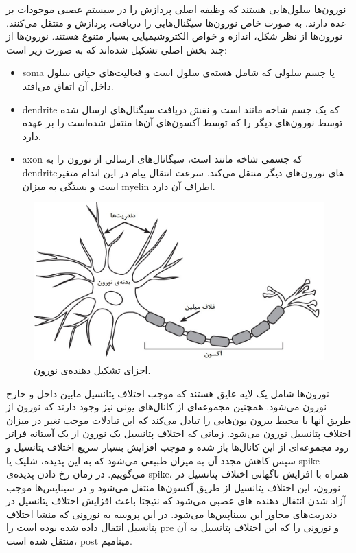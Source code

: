 \documentclass[12pt]{report}
\begin{document}
	نورون‌ها سلول‌هایی هستند که وظیفه اصلی پردازش را در سیستم عصبی موجودات بر عده دارند. به صورت خاص نورون‌ها سیگنال‌هایی را دریافت، پردازش و منتقل می‌کنند. نورون‌ها از نظر شکل، اندازه و خواص الکتروشیمیایی بسیار متنوع هستند. نورون‌ها از چند بخش اصلی تشکیل شده‌اند که به صورت زیر است:
	\begin{itemize}
		\item \gls{soma} یا جسم سلولی که شامل هسته‌ی سلول است و فعالیت‌های حیاتی سلول داخل آن اتفاق می‌افتد.
		\item \gls{dendrite} که یک جسم شاخه مانند است و نقش دریافت سیگنال‌های ارسال شده توسط نورون‌های دیگر را که توسط آکسون‌های آن‌ها منتقل شده‌است را بر عهده دارد.
		\item \gls{axon} که جسمی شاخه مانند است، سیگانال‌های ارسالی از نورون را به \gls{dendrite}‌های نورون‌های دیگر منتقل می‌کند. سرعت انتقال پیام‌‌ در این اندام متغیر است و بستگی به میزان \gls{myelin} اطراف آن دارد.
	\end{itemize}
	
	\begin{figure}[H]
		\centering
		\includegraphics[width=0.7\linewidth]{neuron.jpg}
		\caption[NS]{
			اجزای تشکیل دهنده‌ی نورون\footnotemark.
		}
		\label{fig:neuron}
	\end{figure}
	
	
	
	نورون‌ها شامل یک لایه عایق هستند که موجب اختلاف پتانسیل مابین داخل و خارج نورون می‌شود. همچنین مجموعه‌ای از کانال‌های یونی نیز وجود دارند که نورون از طریق آنها با محیط بیرون یون‌هایی را تبادل می‌کند که این تبادلات موجب تغیر در میزان اختلاف پتانسیل نورون می‌شود. زمانی که اختلاف پتانسیل یک نورون از یک آستانه فراتر رود مجموعه‌ای از این کانال‌ها باز شده و موجب افزایش بسیار سریع اختلاف پتانسیل و سپس کاهش مجدد آن به میزان طبیعی می‌شود که به این پدیده، شلیک یا \gls{spike} می‌گوییم. در زمان رخ دادن پدیده‌ی \gls{spike}، همراه با افزایش ناگهانی اختلاف پتانسیل در نورون، این اختلاف پتانسیل از طریق آکسون‌ها منتقل می‌شود و در سیناپس‌ها موجب آزاد شدن انتقال دهنده های عصبی می‌شود که نتیجتا باعث افزایش اختلاف پتانسیل در دندریت‌های مجاور این سیناپس‌ها می‌شود. در این پروسه به نورونی که منشا اختلاف پتانسیل انتقال داده شده بوده است را \gls{pre}‌ و نورونی را که این اختلاف پتانسیل به آن منتقل شده است، \gls{post}‌ مینامیم.
	
\end{document}
